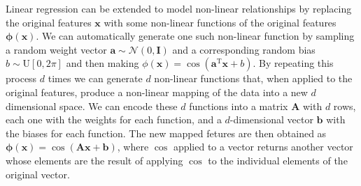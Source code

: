 \documentclass[submit]{harvardml}
\newcommand{\N}{\mathcal{N}}
\theoremstyle{plain}
\begin{document}
Linear regression can be extended to model non-linear relationships by
replacing the original features $\mathbf{x}$ with some non-linear functions of
the original features $\bm \phi(\mathbf{x})$. We can automatically generate one
such non-linear function by sampling a random weight vector $\mathbf{a}
\sim \N(0,\mathbf{I})$ and a corresponding random bias $b \sim
\text{U}[0, 2\pi]$ and then making $\phi(\mathbf{x}) = \cos(\mathbf{a}^\text{T}
\mathbf{x} + b)$.  By repeating this process $d$ times we can generate $d$
non-linear functions that, when applied to the original features, produce a
non-linear mapping of the data into a new $d$ dimensional space.
We can encode these $d$ functions into a matrix $\mathbf{A}$ with $d$ rows, each one
with the weights for each function, and a $d$-dimensional vector $\mathbf{b}$
with the biases for each function. The new mapped fetures are then obtained as
$\bm \phi (\mathbf{x}) = \cos(\mathbf{A} \mathbf{x} + \mathbf{b})$, where
$\cos$ applied to a vector returns another vector whose elements are the result
of applying $\cos$ to the individual elements of the original vector.
\end{document}
